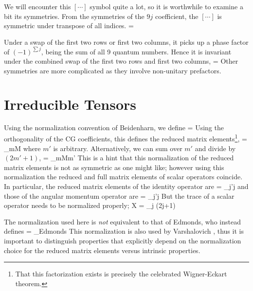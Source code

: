 \documentclass{article}[10pt]
\begin{document}
We will encounter this $[\cdots]$ symbol quite a lot, so it is worthwhile to examine a bit its symmetries.
From the symmetries of the $9j$ coefficient, the $[\cdots]$ is symmetric under transpose of all indices.
\beq
{}
=
\eeq

Under a swap of the first two rows or first two columns, it picks up a phase factor of $(-1)^{\sum j}$,
being the sum of all 9 quantum numbers. Hence it is invariant under the combined swap of the first two
rows and first two columns,
\beq
{}
=
\eeq
Other symmetries are more complicated as they involve non-unitary prefactors.

\section{Irreducible Tensors}

Using the normalization convention of Beidenharn, we define
\beq
{}
=  \; 
\label{eq:ITensorDef}
\eeq
Using the orthogonality of the CG coefficients, this defines the
reduced matrix elements\footnote{That this factorization exists is
  precisely the celebrated Wigner-Eckart theorem.},
\beq
{}
= \sum_{mM}  
\eeq
where $m'$ is arbitrary.  Alternatively,
we can sum over $m'$ and divide by $(2m'+1)$,
\beq
{}
= \sum_{mMm'}   
\eeq
This is a hint that this normalization of the reduced matrix elements
is not as symmetric as one might like; however
using this normalization the reduced and
full matrix elements of scalar operators coincide.  In particular,
the reduced matrix elements of the identity operator are
\beq
{} = \delta_{j'j}
\eeq
and those of the angular momentum operator are
\beq
{} =  \; \delta_{j'j}
\eeq
But the trace of a scalar operator needs to be normalized properly;
\beq
\Tr X = \sum_{j} (2j+1) 
\eeq

The normalization used here
is \textit{not} equivalent to that of Edmonds,
who instead defines
\beq
{}
= _{\mbox{Edmonds}}
\;  
\eeq
This normalization is also used by Varshalovich \etal \cite{Varsh}, 
thus it is important to
distinguish properties that explicitly depend on the normalization choice
for the reduced matrix elements versus intrinsic properties.
\end{document}

